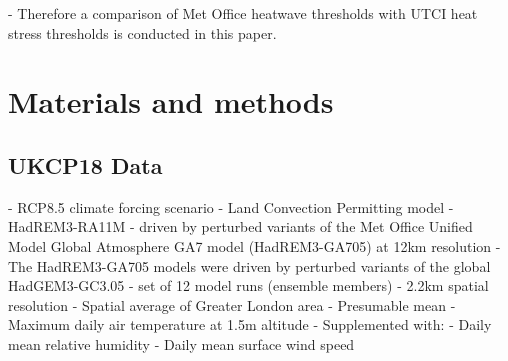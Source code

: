 \documentclass[10pt,letterpaper]{article}
\begin{document}
- Therefore a comparison of Met Office heatwave thresholds with UTCI heat stress thresholds is conducted in this paper.


    

    


\pagebreak

\section*{Materials and methods}

\subsection*{UKCP18 Data}

- RCP8.5 climate forcing scenario
- Land Convection Permitting model
    - HadREM3-RA11M
    - driven by perturbed variants of the Met Office Unified Model Global Atmosphere GA7 model (HadREM3-GA705) at 12km resolution
    - The HadREM3-GA705 models were driven by perturbed variants of the global HadGEM3-GC3.05
- set of 12 model runs (ensemble members)
- 2.2km spatial resolution
    - Spatial average of Greater London area
    - Presumable mean
- Maximum daily air temperature at 1.5m altitude
- Supplemented with:
    - Daily mean relative humidity
    - Daily mean surface wind speed
\end{document}
